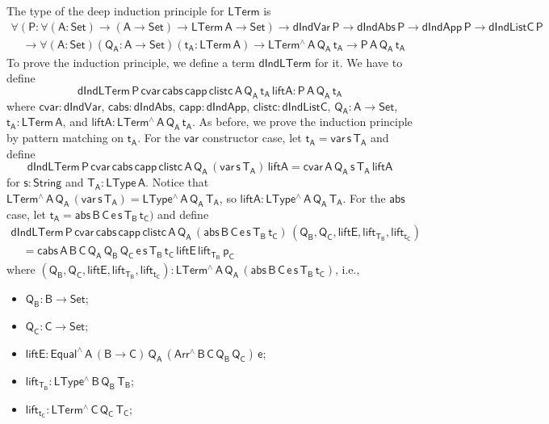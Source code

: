 \documentclass[9pt]{entcs} \usepackage{entcsmacro}
\begin{document}
The type of the deep induction principle for $\mathsf{LTerm}$ is
\[
\begin{array}{l}
\mathsf{\forall (P : \forall (A : Set) \to (A \to Set) \to LTerm\,A \to Set)
  \to dIndVar\,P \to dIndAbs\,P \to dIndApp\,P \to dIndListC\,P} \\
\quad \mathsf{\to \forall (A : Set)(Q_A : A \to Set)(t_A : LTerm\,A) \to LTerm^{\wedge}\,A\,Q_A\,t_A \to P\,A\,Q_A\,t_A}
\end{array}
\]
To prove the induction principle, we define a term $\mathsf{dIndLTerm}$ for it.
We have to define 
\[ 
\mathsf{dIndLTerm \, P\, cvar \, cabs\, capp\, clistc \, A\, Q_A\, t_A\, liftA : P\, A\, Q_A\, t_A}
\]
where $\mathsf{cvar: dIndVar}$, $\mathsf{cabs: dIndAbs}$, $\mathsf{capp : dIndApp}$, $\mathsf{clistc : dIndListC}$,
$\mathsf{Q_A : A \to Set}$, $\mathsf{t_A : LTerm\,A}$, and $\mathsf{liftA : LTerm^{\wedge}\,A\,Q_A\,t_A}$.
As before, we prove the induction principle by pattern matching on $\mathsf{t_A}$. 
For the $\mathsf{var}$ constructor case, let $\mathsf{t_A = var\, s\, T_A}$ and define
\[
  \mathsf{dIndLTerm \, P\, cvar \, cabs\, capp\, clistc \, A\, Q_A\, (var\,s\,T_A) \, liftA = cvar \, A\, Q_A\, s\, T_A\, liftA }
\]
for $\mathsf{s : String}$ and $\mathsf{T_A : LType\,A}$.
Notice that $\mathsf{LTerm^{\wedge}\, A\, Q_A\, (var\,s\,T_A) = LType^{\wedge}\,A\,Q_A\,T_A}$, so 
$\mathsf{liftA : LType^{\wedge}\,A\,Q_A\,T_A}$.
%
For the $\mathsf{abs}$ case, let $\mathsf{t_A = abs \,B \,C \, e \,s \,T_B \, t_C)} $ and define
\[
\begin{array}{l}
\mathsf{dIndLTerm \, P\, cvar \, cabs\, capp\, clistc \, A\, Q_A\, (abs \,B \,C \,e \,s \,T_B \, t_C) \, (Q_B , Q_C , liftE, lift_{T_B}, lift_{t_C})} \\
\quad \mathsf{= cabs\,A\,B\,C\, Q_A\, Q_B\, Q_C\, e\, s\, T_B\, t_C\, liftE\, lift_{T_B}\, p_C}
\end{array}
\]
where $\mathsf{(Q_B , Q_C , liftE, lift_{T_B}, lift_{t_C}) : LTerm^{\wedge}\, A\, Q_A\, (abs \,B \,C \, e \,s \,T_B \, t_C)}$, i.e.,
\begin{itemize}
  \item $\mathsf{Q_B : B \to Set}$;
  \item $\mathsf{Q_C : C \to Set}$;
  \item $\mathsf{liftE : Equal^{\wedge} \, A\, (B \to C)\, Q_A\, (Arr^{\wedge} \, B\, C\, Q_B \, Q_C) \, e}$;
  \item $\mathsf{lift_{T_B}: LType^{\wedge} \, B\, Q_B\, T_B}$;
  \item $\mathsf{lift_{t_C}: LTerm^{\wedge} \, C\, Q_C\, T_C}$;
\end{itemize}
\end{document}
